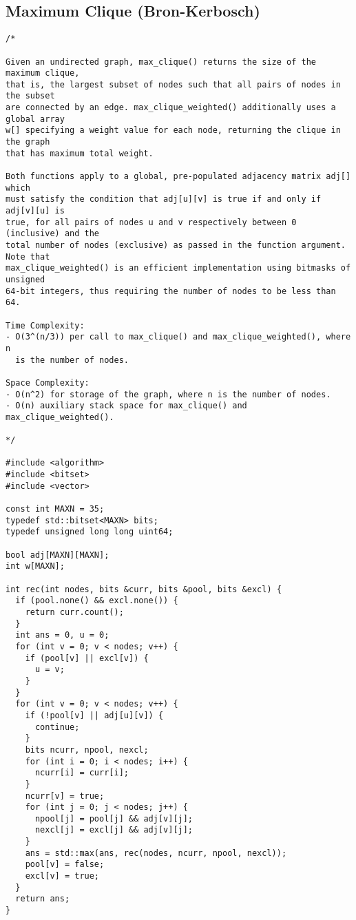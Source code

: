 \subsection{Maximum Clique (Bron-Kerbosch)}
\begin{lstlisting}
/*

Given an undirected graph, max_clique() returns the size of the maximum clique,
that is, the largest subset of nodes such that all pairs of nodes in the subset
are connected by an edge. max_clique_weighted() additionally uses a global array
w[] specifying a weight value for each node, returning the clique in the graph
that has maximum total weight.

Both functions apply to a global, pre-populated adjacency matrix adj[] which
must satisfy the condition that adj[u][v] is true if and only if adj[v][u] is
true, for all pairs of nodes u and v respectively between 0 (inclusive) and the
total number of nodes (exclusive) as passed in the function argument. Note that
max_clique_weighted() is an efficient implementation using bitmasks of unsigned
64-bit integers, thus requiring the number of nodes to be less than 64.

Time Complexity:
- O(3^(n/3)) per call to max_clique() and max_clique_weighted(), where n
  is the number of nodes.

Space Complexity:
- O(n^2) for storage of the graph, where n is the number of nodes.
- O(n) auxiliary stack space for max_clique() and max_clique_weighted().

*/

#include <algorithm>
#include <bitset>
#include <vector>

const int MAXN = 35;
typedef std::bitset<MAXN> bits;
typedef unsigned long long uint64;

bool adj[MAXN][MAXN];
int w[MAXN];

int rec(int nodes, bits &curr, bits &pool, bits &excl) {
  if (pool.none() && excl.none()) {
    return curr.count();
  }
  int ans = 0, u = 0;
  for (int v = 0; v < nodes; v++) {
    if (pool[v] || excl[v]) {
      u = v;
    }
  }
  for (int v = 0; v < nodes; v++) {
    if (!pool[v] || adj[u][v]) {
      continue;
    }
    bits ncurr, npool, nexcl;
    for (int i = 0; i < nodes; i++) {
      ncurr[i] = curr[i];
    }
    ncurr[v] = true;
    for (int j = 0; j < nodes; j++) {
      npool[j] = pool[j] && adj[v][j];
      nexcl[j] = excl[j] && adj[v][j];
    }
    ans = std::max(ans, rec(nodes, ncurr, npool, nexcl));
    pool[v] = false;
    excl[v] = true;
  }
  return ans;
}


\end{lstlisting}
